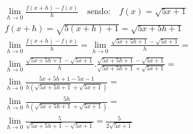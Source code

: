 \begin{ex}
\begin{align}
&\lim_{h\rightarrow 0} \frac{f(x+h)-f(x)}{h}\quad\text{sendo:}\quad f(x)=\sqrt{5x+1}\nonumber\\
&f(x+h)=\sqrt{5(x+h)+1}=\sqrt{5x+5h+1}\nonumber\\
&\lim_{h\rightarrow 0} \frac{f(x+h)-f(x)}{h}=\lim_{h\rightarrow 0} \frac{\sqrt{5x+5h+1}-\sqrt{5x+1}}{h}=\nonumber\\
&\lim_{h\rightarrow 0} \frac{\sqrt{5x+5h+1}-\sqrt{5x+1}}{h}.\frac{\sqrt{5x+5h+1}-\sqrt{5x+1}}{\sqrt{5x+5h+1}+\sqrt{5x+1}}=\nonumber\\
&\lim_{h\rightarrow 0} \frac{5x+5h+1-5x-1}{h(\sqrt{5x+5h+1}+\sqrt{5x+1})}=\nonumber\\
&\lim_{h\rightarrow 0} \frac{5h}{h(\sqrt{5x+5h+1}+\sqrt{5x+1})}=\nonumber\\
&\lim_{h\rightarrow 0 } \frac{5}{\sqrt{5x+5h+1}-\sqrt{5x+1}}=\frac{5}{2\sqrt{5x+1}}\nonumber
\end{align}
\end{ex}